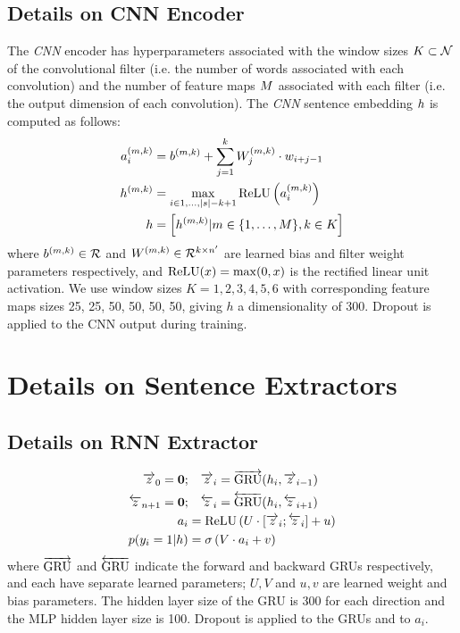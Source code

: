 \subsection{Details on CNN Encoder} \label{app:cnnencoder}
The \textit{CNN} encoder has hyperparameters
associated with the window sizes $K \subset \mathcal{N}$ of the convolutional filter 
(i.e. the number of words associated with each convolution) and the number of 
feature maps $M$ associated with each filter
(i.e. the output dimension of each 
convolution). 
The \textit{CNN} sentence embedding $\sentEmb$ is computed as follows:
\begin{align}
 \specActivation_i &= \specConvBias 
    + \sum^\filterWindowSize_{j=1} \specConvWeight_j \cdot \wemb_{i + j -1}\\
  \specFeatureMap &= \max_{i\in 1,\dots, |\sent| - \filterWindowSize + 1} 
                      \relu\left(\specActivation_i\right) \\
 \sentEmb &= \left[\specFeatureMap | 
   \numFeatureMaps \in \{1, \ldots, \maxFeatureMaps\},
   \filterWindowSize \in \maxWindowSize
   \right]
\end{align}
where $b^{(m,k)}\in\mathcal{R}$ and $W^{(m,k)} \in 
\mathcal{R}^{k \times {n^\prime}}$ are learned bias and filter
weight parameters respectively, and $\operatorname{ReLU}(x) = \max(0, x)$ is the rectified
linear unit activation.
We use window sizes $K={1, 2, 3, 4, 5, 6}$ with corresponding feature maps sizes 25, 25, 50, 50, 50, 50, giving $h$ a dimensionality of 300. 
Dropout is applied to the CNN output during training.

\section{Details on Sentence Extractors} \label{app:sentextractors}
\subsection{Details on RNN Extractor} \label{app:rnnextractor}
\begin{align}
    \rExtHidden_0 = \mathbf{0};&\quad   \rExtHidden_i = \rgru(\sentEmb[i], \rExtHidden_{i-1}) \\
    \lExtHidden_{\docSize + 1} = \mathbf{0};&\quad    \lExtHidden_i = \lgru(\sentEmb[i], \lExtHidden_{i+1}) \\
   \logits_i &= \relu\left(U \cdot [\rExtHidden_i; \lExtHidden_i] + u \right)\\
   p(\slabel_i=1|\sentvec) &= \sigma\left(V\cdot \logits_i + v  \right)
\end{align}
where $\overrightarrow{\operatorname{GRU}}$ and $\overleftarrow{\operatorname{GRU}}$ indicate the 
forward and backward GRUs respectively, and each have separate learned 
parameters; $U, V$ and $u, v$ are learned weight and bias parameters.
The hidden layer size of the GRU is 300 for each direction and the MLP hidden layer
size is 100. Dropout is applied to the GRUs and to $a_i$.

